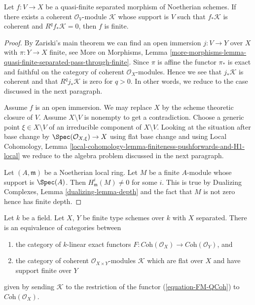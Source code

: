 \begin{lemma}
\label{lemma-characterize-finite}
Let $f : V \to X$ be a quasi-finite separated morphism of Noetherian
schemes. If there exists a coherent $\mathcal{O}_V$-module $\mathcal{K}$
whose support is $V$ such that $f_*\mathcal{K}$ is coherent and
$R^qf_*\mathcal{K} = 0$, then $f$ is finite.
\end{lemma}

\begin{proof}
By Zariski's main theorem we can find an open immersion
$j : V \to Y$ over $X$ with $\pi : Y \to X$ finite, see
More on Morphisms, Lemma
\ref{more-morphisms-lemma-quasi-finite-separated-pass-through-finite}.
Since $\pi$ is affine the functor $\pi_*$ is exact and faithful
on the category of coherent $\mathcal{O}_X$-modules.
Hence we see that $j_*\mathcal{K}$ is coherent and
that $R^qj_*\mathcal{K}$ is zero for $q > 0$.
In other words, we reduce to the case discussed in the next paragraph.

\medskip\noindent
Assume $f$ is an open immersion. We may replace $X$ by the
scheme theoretic closure of $V$. Assume $X \setminus V$ is nonempty
to get a contradiction. Choose a generic point $\xi \in X \setminus V$
of an irreducible component of $X \setminus V$. Looking at the situation
after base change by $\Spec(\mathcal{O}_{X, \xi}) \to X$ using flat base
change and using
Local Cohomology, Lemma
\ref{local-cohomology-lemma-finiteness-pushforwards-and-H1-local}
we reduce to the algebra problem discussed in the next paragraph.

\medskip\noindent
Let $(A, \mathfrak m)$ be a Noetherian local ring. Let $M$ be a finite
$A$-module whose support is $\Spec(A)$. Then $H^i_\mathfrak m(M) \not = 0$
for some $i$. This is true by
Dualizing Complexes, Lemma \ref{dualizing-lemma-depth}
and the fact that $M$ is not zero hence has finite depth.
\end{proof}

\begin{lemma}
\label{lemma-functor-coherent-over-field}
Let $k$ be a field. Let $X$, $Y$ be finite type schemes over $k$ with
$X$ separated. There is an equivalence of categories between
\begin{enumerate}
\item the category of $k$-linear exact functors
$F : \textit{Coh}(\mathcal{O}_X) \to \textit{Coh}(\mathcal{O}_Y)$, and
\item the category of coherent $\mathcal{O}_{X \times Y}$-modules
$\mathcal{K}$ which are flat over $X$ and have support finite over $Y$
\end{enumerate}
given by sending $\mathcal{K}$ to the restriction of the functor
(\ref{equation-FM-QCoh}) to $\textit{Coh}(\mathcal{O}_X)$.
\end{lemma}

